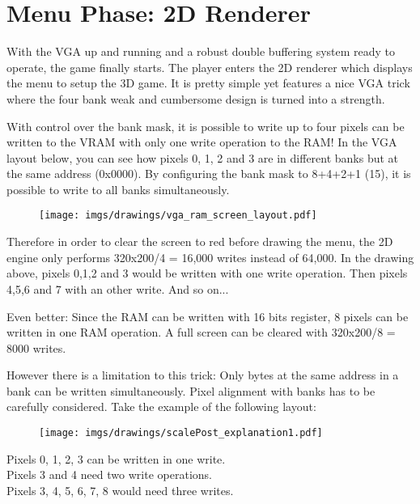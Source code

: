 \section{Menu Phase: 2D Renderer}
With the VGA up and running and a robust double buffering system ready to operate, the game finally starts. The player enters the 2D renderer which displays the menu to setup the 3D game. It is pretty simple yet features a nice VGA trick where the four bank weak and cumbersome design is turned into a strength.
\par
\begin{figure}[H]
\centering
{}
\end{figure}
\par

With control over the bank mask, it is possible to write up to four pixels can be written to the VRAM with only one write operation to the RAM! In the VGA layout below, you can see how pixels 0, 1, 2 and 3 are in different banks but at the same address (0x0000). By configuring the bank mask to 8+4+2+1 (15), it is possible to write to all banks simultaneously.\\
\par
\begin{figure}[H]
\centering
\texttt{[image: imgs/drawings/vga\_ram\_screen\_layout.pdf]}
\end{figure}

\par
Therefore in order to clear the screen to red before drawing the menu, the 2D engine only performs 320x200/4 = 16,000 writes instead of 64,000. In the drawing above, pixels 0,1,2 and 3 would be written with one write operation. Then pixels 4,5,6 and 7 with an other write. And so on...\\
\par
Even better: Since the RAM can be written with 16 bits register, 8 pixels can be written in one RAM operation. A full screen can be cleared with 320x200/8 = 8000 writes.
\par
\begin{minipage}{\textwidth}

\end{minipage}
However there is a limitation to this trick: Only bytes at the same address in a bank can be written simultaneously. Pixel alignment with banks has to be carefully considered. Take the example of the following layout:\\
\par
\begin{figure}[H]
\centering
 \texttt{[image: imgs/drawings/scalePost\_explanation1.pdf]}
 \end{figure}
Pixels 0, 1, 2, 3 can be written in one write.\\
Pixels 3 and 4 need two write operations.\\
Pixels 3, 4, 5, 6, 7, 8 would need three writes.\\


